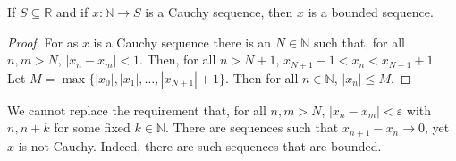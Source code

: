 \documentclass[crop=false,class=book,oneside]{standalone}
\begin{document}
            \begin{theorem}
                If $S\subseteq\mathbb{R}$ and if
                $x:\mathbb{N}\rightarrow{S}$ is a Cauchy sequence,
                then $x$ is a bounded sequence.
            \end{theorem}
            \begin{proof}
                For as $x$ is a Cauchy sequence there is an
                $N\in\mathbb{N}$ such that, for all $n,m>N$,
                $|x_{n}-x_{m}|<1$. Then, for all $n>N+1$,
                $x_{N+1}-1<x_{n}<x_{N+1}+1$. Let
                $M=\max\{|x_{0}|,|x_{1}|,\hdots,|x_{N+1}|+1\}$.
                Then for all $n\in\mathbb{N}$,
                $|x_{n}|\leq{M}$.
            \end{proof}
            We cannot replace the requirement that,
            for all $n,m>N$, $|x_{n}-x_{m}|<\varepsilon$
            with $n,n+k$ for some fixed $k\in\mathbb{N}$.
            There are sequences such that
            $x_{n+1}-x_{n}\rightarrow{0}$,
            yet $x$ is not Cauchy. Indeed, there are such sequences
            that are bounded.
\end{document}
